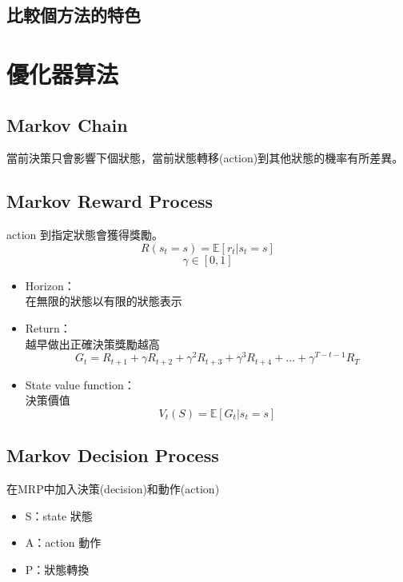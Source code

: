\documentclass[14pt,a4paper]{report}  %
\begin{document}
\section{比較個方法的特色}
\newpage
\chapter{優化器算法}

\section{Markov Chain}
\quad 當前決策只會影響下個狀態，當前狀態轉移(action)到其他狀態的機率有所差異。
\section{Markov Reward Process}
\quad action 到指定狀態會獲得獎勵。
$$R(s_t=s) = \mathbb{E}[r_t|s_t = s]$$
$$\gamma \in [0, 1]$$
\begin{itemize}
\item Horizon：\\
在無限的狀態以有限的狀態表示\\
\item Return：\\
越早做出正確決策獎勵越高\\
$$G_t = R_{t+1}+\gamma R_{t+2}+\gamma^2 R_{t+3}+\gamma^3 R_{t+4}+...+\gamma^{T-t-1} R_{T}$$

\item State value function：\\
決策價值\\
$$V_t(S) = \mathbb{E}[G_t|s_t = s]$$
\begin{center}
\hspace{-4em}
\end{center}
\end{itemize}

\section{Markov Decision Process}
\quad 在MRP中加入決策(decision)和動作(action)\\
\begin{itemize}
\item S：state 狀態
\item A：action 動作
\item P：狀態轉換\\[6pt]
\begin{center}
\hspace{-4em}
\end{center}

\end{itemize}
\newpage
\end{document}
